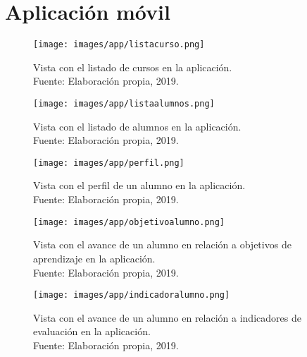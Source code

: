 \chapter{Aplicación móvil}

\begin{figure}[H]
	\centering
	\captionsetup{justification=centering}
	\texttt{[image: images/app/listacurso.png]}
	\caption[Vista con el listado de cursos en la aplicación.]{Vista con el listado de cursos en la aplicación.\\Fuente: Elaboración propia, 2019.}
\end{figure}

\begin{figure}[H]
	\centering
	\captionsetup{justification=centering}
	\texttt{[image: images/app/listaalumnos.png]}
	\caption[Vista con el listado de alumnos en la aplicación.]{{Vista con el listado de alumnos en la aplicación.\\Fuente: Elaboración propia, 2019.}}
\end{figure}

\begin{figure}[H]
	\centering
	\captionsetup{justification=centering}
	\texttt{[image: images/app/perfil.png]}
	\caption[Vista con el perfil de un alumno en la aplicación.]{{Vista con el perfil de un alumno en la aplicación.\\Fuente: Elaboración propia, 2019.}}
\end{figure}

\begin{figure}[H]
	\centering
	\captionsetup{justification=centering}
	\texttt{[image: images/app/objetivoalumno.png]}
	\caption[Vista con el avance de un alumno en relación a objetivos de aprendizaje en la aplicación.]{{Vista con el avance de un alumno en relación a objetivos de aprendizaje en la aplicación.\\Fuente: Elaboración propia, 2019.}}
\end{figure}

\begin{figure}[H]
	\centering
	\captionsetup{justification=centering}
	\texttt{[image: images/app/indicadoralumno.png]}
	\caption[Vista con el avance de un alumno en relación a indicadores de evaluación en la aplicación.]{{Vista con el avance de un alumno en relación a indicadores de evaluación en la aplicación.\\Fuente: Elaboración propia, 2019.}}
\end{figure}

